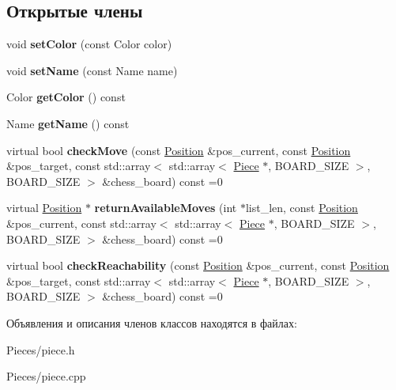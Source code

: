 \subsection*{Открытые члены}
\begin{DoxyCompactItemize}
\item 
\mbox{\label{class_chess_1_1_piece_a641074d67cbc2f7d7290a8b721a57f16}} 
void {\bfseries set\+Color} (const Color color)
\item 
\mbox{\label{class_chess_1_1_piece_abfc56a5956d7abf5e2b9765829b113ea}} 
void {\bfseries set\+Name} (const Name name)
\item 
\mbox{\label{class_chess_1_1_piece_a234a31e7eb30f8f6112893fc97d2e270}} 
Color {\bfseries get\+Color} () const
\item 
\mbox{\label{class_chess_1_1_piece_a145087e3b290d9a274dc301d3fe530ea}} 
Name {\bfseries get\+Name} () const
\item 
\mbox{\label{class_chess_1_1_piece_a2e94ad5b115beff701856fb947327b36}} 
virtual bool {\bfseries check\+Move} (const \mbox{\hyperlink{class_chess_1_1_position}{Position}} \&pos\+\_\+current, const \mbox{\hyperlink{class_chess_1_1_position}{Position}} \&pos\+\_\+target, const std\+::array$<$ std\+::array$<$ \mbox{\hyperlink{class_chess_1_1_piece}{Piece}} $\ast$, B\+O\+A\+R\+D\+\_\+\+S\+I\+ZE $>$, B\+O\+A\+R\+D\+\_\+\+S\+I\+ZE $>$ \&chess\+\_\+board) const =0
\item 
\mbox{\label{class_chess_1_1_piece_a6d4afbd864b16f2574cd5af30f961047}} 
virtual \mbox{\hyperlink{class_chess_1_1_position}{Position}} $\ast$ {\bfseries return\+Available\+Moves} (int $\ast$list\+\_\+len, const \mbox{\hyperlink{class_chess_1_1_position}{Position}} \&pos\+\_\+current, const std\+::array$<$ std\+::array$<$ \mbox{\hyperlink{class_chess_1_1_piece}{Piece}} $\ast$, B\+O\+A\+R\+D\+\_\+\+S\+I\+ZE $>$, B\+O\+A\+R\+D\+\_\+\+S\+I\+ZE $>$ \&chess\+\_\+board) const =0
\item 
\mbox{\label{class_chess_1_1_piece_a697016b0e460d10d45d0e75a8fdb82bf}} 
virtual bool {\bfseries check\+Reachability} (const \mbox{\hyperlink{class_chess_1_1_position}{Position}} \&pos\+\_\+current, const \mbox{\hyperlink{class_chess_1_1_position}{Position}} \&pos\+\_\+target, const std\+::array$<$ std\+::array$<$ \mbox{\hyperlink{class_chess_1_1_piece}{Piece}} $\ast$, B\+O\+A\+R\+D\+\_\+\+S\+I\+ZE $>$, B\+O\+A\+R\+D\+\_\+\+S\+I\+ZE $>$ \&chess\+\_\+board) const =0
\end{DoxyCompactItemize}


Объявления и описания членов классов находятся в файлах\+:\begin{DoxyCompactItemize}
\item 
Pieces/piece.\+h\item 
Pieces/piece.\+cpp\end{DoxyCompactItemize}

